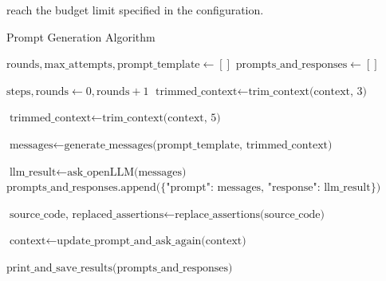 \begin{enumerate}
reach the budget limit specified in the configuration. 

        \begin{algorithm}
            \caption{Prompt Generation Algorithm}
            \label{algorithm_prompt_generation}
            \begin{algorithmic}[1]
                    \State $\text{rounds}, \text{max\_attempts}, \text{prompt\_template} \gets []$ 
                    \State $\text{prompts\_and\_responses} \gets []$
                    
                        \State $\text{steps}, \text{rounds} \gets 0, \text{rounds} + 1$
                            \State $\text{trimmed\_context} \gets \text{trim\_context(context, 3)}$ 
                        \EndIf
                        
                            \State $\text{trimmed\_context} \gets \text{trim\_context(context, 5)}$ 
                        \EndIf
                        
                        \State $\text{messages} \gets \text{generate\_messages(prompt\_template, trimmed\_context)}$
                        
                        \State $\text{llm\_result} \gets \text{ask\_openLLM(messages)}$
                        \State $\text{prompts\_and\_responses.append(\{"prompt": messages, "response": llm\_result\})}$
                        
                        \State $\text{source\_code, replaced\_assertions} \gets \text{replace\_assertions(source\_code)}$
                        
                            \State $\text{context} \gets \text{update\_prompt\_and\_ask\_again(context)}$
                        \EndIf
                    \EndWhile
                    
                    \State $\text{print\_and\_save\_results(prompts\_and\_responses)}$
                \EndFunction
            \end{algorithmic}
        \end{algorithm}
    \end{enumerate}

